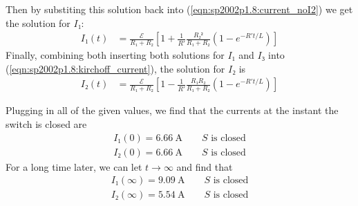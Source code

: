 Then by substiting this solution back into (\ref{eqn:sp2002p1.8:current_noI2})
we get the solution for $I₁$:
\begin{align}
    I₁(t) &= \frac{\mathcal E}{R₁+R₂} \left[ 1 + \frac{1}{R'}
	\frac{{R₂}²}{R₁+R₂} (1 - e^{-R't/L}) \right]
	\label{eqn:sp2002p1.8:I1_charging}
\end{align}
Finally, combining both inserting both solutions for $I₁$ and $I₃$ into
(\ref{eqn:sp2002p1.8:kirchoff_current}), the solution for $I₂$ is
\begin{align}
    I₂(t) &= \frac{\mathcal E}{R₁+R₂} \left[ 1 - \frac{1}{R'}
	\frac{R₁R₂}{R₁+R₂} (1 - e^{-R't/L}) \right]
	\label{eqn:sp2002p1.8:I2_charging}
\end{align}

Plugging in all of the given values, we find that the currents at the instant
the switch is closed are
\begin{align}
    \boxed{I₁(0) = \SI{6.66}{\A}\quad\quad\text{$S$ is closed}} \\
    \boxed{I₂(0) = \SI{6.66}{\A}\quad\quad\text{$S$ is closed}}
\end{align}
For a long time later, we can let $t \rightarrow ∞$ and find that
\begin{align}
    \boxed{I₁(∞) = \SI{9.09}{\A}\quad\quad\text{$S$ is closed}} \\
    \boxed{I₂(∞) = \SI{5.54}{\A}\quad\quad\text{$S$ is closed}}
\end{align}

